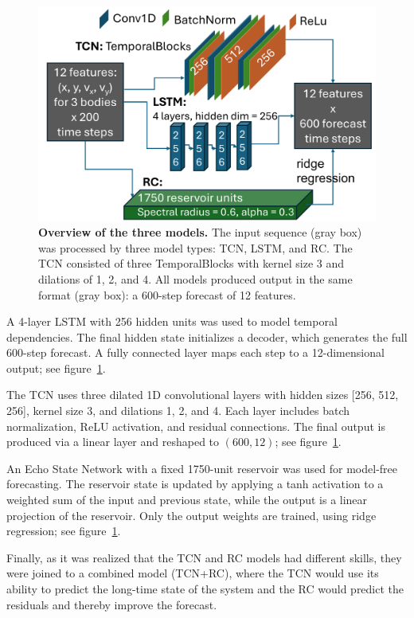 \documentclass[%
 reprint,
 amsmath,amssymb,
 aps,
]{revtex4-2}
\begin{document}
\begin{figure}
    \centering
    \includegraphics[width=0.99\linewidth]{MethodOverview.png}
    \caption{{\bf Overview of the three models.} The input sequence (gray box) was processed by three model types: TCN, LSTM, and RC. The TCN consisted of three TemporalBlocks with kernel size 3 and dilations of 1, 2, and 4. All models produced output in the same format (gray box): a 600-step forecast of 12 features.}
    \label{fig:methodoverview}
\end{figure}



A 4-layer LSTM with 256 hidden units was used to model temporal dependencies. The final hidden state initializes a decoder, which generates the full 600-step forecast. A fully connected layer maps each step to a 12-dimensional output; see figure~\ref{fig:methodoverview}.


The TCN uses three dilated 1D convolutional layers with hidden sizes [256, 512, 256], kernel size 3, and dilations 1, 2, and 4. Each layer includes batch normalization, ReLU activation, and residual connections. The final output is produced via a linear layer and reshaped to $(600, 12)$; see figure~\ref{fig:methodoverview}.


An Echo State Network with a fixed 1750-unit reservoir was used for model-free forecasting. The reservoir state is updated by applying a tanh activation to a weighted sum of the input and previous state, while the output is a linear projection of the reservoir. Only the output weights are trained, using ridge regression; see figure~\ref{fig:methodoverview}.


Finally, as it was realized that the TCN and RC models had different skills, they were joined to a combined model (TCN+RC), where the TCN would use its ability to predict the long-time state of the system and the RC would predict the residuals and thereby improve the forecast.
\end{document}
